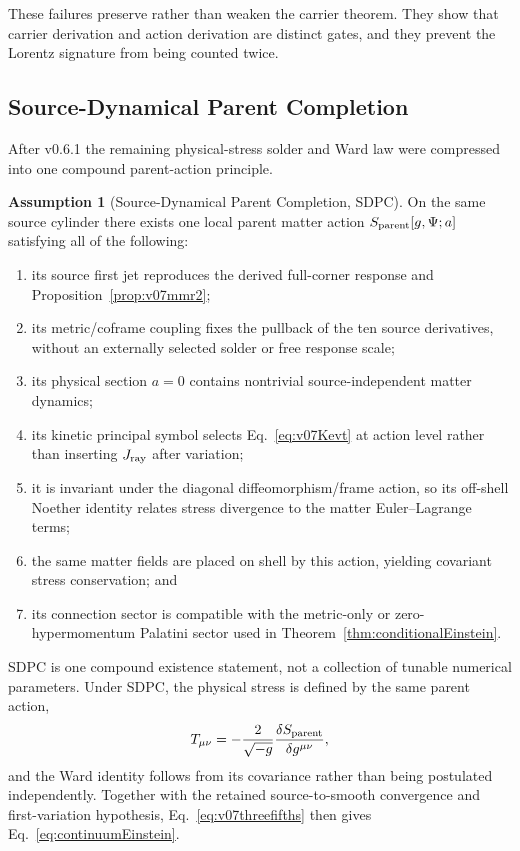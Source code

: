 \documentclass[11pt]{article}
\theoremstyle{definition}
\newtheorem{assumption}[theorem]{Assumption}
\theoremstyle{remark}
\begin{document}
These failures preserve rather than weaken the carrier theorem. They show that carrier derivation and action derivation are distinct gates, and they prevent the Lorentz signature from being counted twice.

\subsection{Source-Dynamical Parent Completion}

After v0.6.1 the remaining physical-stress solder and Ward law were compressed into one compound parent-action principle.

\begin{assumption}[Source-Dynamical Parent Completion, SDPC]\label{ass:v07sdpc}
On the same source cylinder there exists one local parent matter action $S_{\rm parent}[g,\Psi;a]$ satisfying all of the following:
\begin{enumerate}
\item its source first jet reproduces the derived full-corner response and Proposition~\ref{prop:v07mmr2};
\item its metric/coframe coupling fixes the pullback of the ten source derivatives, without an externally selected solder or free response scale;
\item its physical section $a=0$ contains nontrivial source-independent matter dynamics;
\item its kinetic principal symbol selects Eq.~\eqref{eq:v07Kevt} at action level rather than inserting $J_{\rm ray}$ after variation;
\item it is invariant under the diagonal diffeomorphism/frame action, so its off-shell Noether identity relates stress divergence to the matter Euler--Lagrange terms;
\item the same matter fields are placed on shell by this action, yielding covariant stress conservation; and
\item its connection sector is compatible with the metric-only or zero-hypermomentum Palatini sector used in Theorem~\ref{thm:conditionalEinstein}.
\end{enumerate}
\end{assumption}

SDPC is one compound existence statement, not a collection of tunable numerical parameters. Under SDPC, the physical stress is defined by the same parent action,
\begin{equation}\label{eq:v07stress}
 T_{\mu\nu}=-\frac{2}{\sqrt{-g}}
 \frac{\delta S_{\rm parent}}{\delta g^{\mu\nu}},
\end{equation}
and the Ward identity follows from its covariance rather than being postulated independently. Together with the retained source-to-smooth convergence and first-variation hypothesis, Eq.~\eqref{eq:v07threefifths} then gives Eq.~\eqref{eq:continuumEinstein}.
\end{document}
